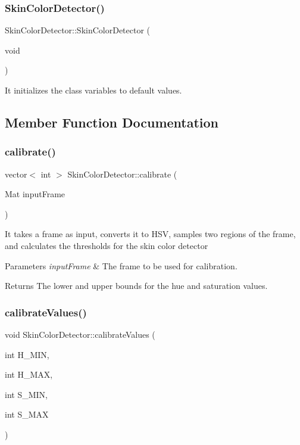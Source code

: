 \subsubsection{\texorpdfstring{Skin\+Color\+Detector()}{SkinColorDetector()}}
{\footnotesize\ttfamily Skin\+Color\+Detector\+::\+Skin\+Color\+Detector (\begin{DoxyParamCaption}\item[{void}]{ }\end{DoxyParamCaption})}

It initializes the class variables to default values. 

\subsection{Member Function Documentation}
\mbox{\label{classSkinColorDetector_ae8b3880d1d75b07e356cd7d1ff128ed9}} 
\subsubsection{\texorpdfstring{calibrate()}{calibrate()}}
{\footnotesize\ttfamily vector$<$ int $>$ Skin\+Color\+Detector\+::calibrate (\begin{DoxyParamCaption}\item[{Mat}]{input\+Frame }\end{DoxyParamCaption})}

It takes a frame as input, converts it to H\+SV, samples two regions of the frame, and calculates the thresholds for the skin color detector


\begin{DoxyParams}{Parameters}
{\em input\+Frame} & The frame to be used for calibration.\\
\hline
\end{DoxyParams}
\begin{DoxyReturn}{Returns}
The lower and upper bounds for the hue and saturation values. 
\end{DoxyReturn}
\mbox{\label{classSkinColorDetector_a4739dae25a983fb35a972f3c0ff8faaf}} 
\subsubsection{\texorpdfstring{calibrate\+Values()}{calibrateValues()}}
{\footnotesize\ttfamily void Skin\+Color\+Detector\+::calibrate\+Values (\begin{DoxyParamCaption}\item[{int}]{H\+\_\+\+M\+IN,  }\item[{int}]{H\+\_\+\+M\+AX,  }\item[{int}]{S\+\_\+\+M\+IN,  }\item[{int}]{S\+\_\+\+M\+AX }\end{DoxyParamCaption})}

